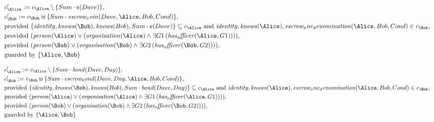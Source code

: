 \begin{align*}
&
c'_
{
\Alice
}
 := 
c_
{
\Alice
}
 \setminus 
\{
Sum
\cdot
\text{\textcent}
(
Dave
)
\}
,\\
&
c'_
{
\Bob
}
 := 
c_
{
\Bob
}
 \uplus 
\{
Sum
\cdot
\mathit{
escrow_coin
}
(
Dave
,
\Alice
,
Bob
,
Cond
)
\}
,\\
&
\text{provided } 
\{
\mathit{
identity
}
,
\mathit{
knows
}
(
\Bob
)
,
\mathit{
knows
}
(
Bob
)
,
Sum
\cdot
\text{\textcent}
(
Dave
)
\}
 \subseteq c_
{
\Alice
}
 \text{ and } 
\mathit{
identity
}
,
\mathit{
knows
}
(
\Alice
)
,
\mathit{
escrow_one_denomination
}
(
\Alice
,
Bob
,
Cond
)
 \in c_
{
\Bob
}
,\\
&
\text{provided } 
(
\mathit{
person
}
(
\Alice
)
\lor
(
\mathit{
organisation
}
(
\Alice
)
\land
\exists 
G1
\,(
\mathit{
has_officer
}
(
\Alice
,
G1
)
)
)
)
,\\
&
\text{provided } 
(
\mathit{
person
}
(
\Bob
)
\lor
(
\mathit{
organisation
}
(
\Bob
)
\land
\exists 
G2
\,(
\mathit{
has_officer
}
(
\Bob
,
G2
)
)
)
)
,\\
&
\text{guarded by } \{
\Alice
,
\Bob
\}
\end{align*}

\begin{align*}
&
c'_
{
\Alice
}
 := 
c_
{
\Alice
}
 \setminus 
\{
Sum
\cdot
\mathit{
bond
}
(
Dave
,
Day
)
\}
,\\
&
c'_
{
\Bob
}
 := 
c_
{
\Bob
}
 \uplus 
\{
Sum
\cdot
\mathit{
escrow_bond
}
(
Dave
,
Day
,
\Alice
,
Bob
,
Cond
)
\}
,\\
&
\text{provided } 
\{
\mathit{
identity
}
,
\mathit{
knows
}
(
\Bob
)
,
\mathit{
knows
}
(
Bob
)
,
Sum
\cdot
\mathit{
bond
}
(
Dave
,
Day
)
\}
 \subseteq c_
{
\Alice
}
 \text{ and } 
\mathit{
identity
}
,
\mathit{
knows
}
(
\Alice
)
,
\mathit{
escrow_one_denomination
}
(
\Alice
,
Bob
,
Cond
)
 \in c_
{
\Bob
}
,\\
&
\text{provided } 
(
\mathit{
person
}
(
\Alice
)
\lor
(
\mathit{
organisation
}
(
\Alice
)
\land
\exists 
G1
\,(
\mathit{
has_officer
}
(
\Alice
,
G1
)
)
)
)
,\\
&
\text{provided } 
(
\mathit{
person
}
(
\Bob
)
\lor
(
\mathit{
organisation
}
(
\Bob
)
\land
\exists 
G2
\,(
\mathit{
has_officer
}
(
\Bob
,
G2
)
)
)
)
,\\
&
\text{guarded by } \{
\Alice
,
\Bob
\}
\end{align*}

